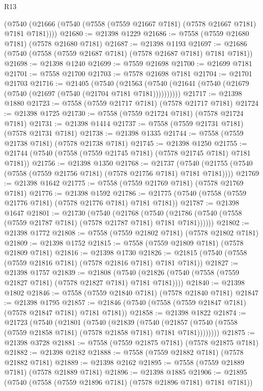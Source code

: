 \begin{lexlean}{R13}
\begin{coremodule}
    (@7540 (@21666 (@7540 (@7558 (@7559 @21667 @7181) (@7578 @21667 @7181) @7181 @7181))))
@21680 := @21398 @1229
@21686 := @7558 (@7559 @21680 @7181) (@7578 @21680 @7181)
@21687 := @21398 @1193
@21697 := @21686 (@7540 (@7558 (@7559 @21687 @7181) (@7578 @21687 @7181) @7181 @7181))
@21698 := @21398 @1240
@21699 := @7559 @21698
@21700 := @21699 @7181
@21701 := @7558 @21700
@21703 := @7578 @21698 @7181
@21704 := @21701 @21703
@21716 := @21405
    (@7540 (@21563 (@7540 (@21641 (@7540 (@21679 (@7540 (@21697 (@7540 (@21704 @7181 @7181))))))))))
@21717 := @21398 @1880
@21723 := @7558 (@7559 @21717 @7181) (@7578 @21717 @7181)
@21724 := @21398 @1725
@21730 := @7558 (@7559 @21724 @7181) (@7578 @21724 @7181)
@21731 := @21398 @1414
@21737 := @7558 (@7559 @21731 @7181) (@7578 @21731 @7181)
@21738 := @21398 @1335
@21744 := @7558 (@7559 @21738 @7181) (@7578 @21738 @7181)
@21745 := @21398 @1250
@21755 := @21744 (@7540 (@7558 (@7559 @21745 @7181) (@7578 @21745 @7181) @7181 @7181))
@21756 := @21398 @1350
@21768 := @21737
    (@7540 (@21755 (@7540 (@7558 (@7559 @21756 @7181) (@7578 @21756 @7181) @7181 @7181))))
@21769 := @21398 @1642
@21775 := @7558 (@7559 @21769 @7181) (@7578 @21769 @7181)
@21776 := @21398 @1592
@21786 := @21775 (@7540 (@7558 (@7559 @21776 @7181) (@7578 @21776 @7181) @7181 @7181))
@21787 := @21398 @1647
@21801 := @21730
    (@7540
      (@21768
        (@7540 (@21786 (@7540 (@7558 (@7559 @21787 @7181) (@7578 @21787 @7181) @7181 @7181))))))
@21802 := @21398 @1772
@21808 := @7558 (@7559 @21802 @7181) (@7578 @21802 @7181)
@21809 := @21398 @1752
@21815 := @7558 (@7559 @21809 @7181) (@7578 @21809 @7181)
@21816 := @21398 @1730
@21826 := @21815 (@7540 (@7558 (@7559 @21816 @7181) (@7578 @21816 @7181) @7181 @7181))
@21827 := @21398 @1757
@21839 := @21808
    (@7540 (@21826 (@7540 (@7558 (@7559 @21827 @7181) (@7578 @21827 @7181) @7181 @7181))))
@21840 := @21398 @1802
@21846 := @7558 (@7559 @21840 @7181) (@7578 @21840 @7181)
@21847 := @21398 @1795
@21857 := @21846 (@7540 (@7558 (@7559 @21847 @7181) (@7578 @21847 @7181) @7181 @7181))
@21858 := @21398 @1822
@21874 := @21723
    (@7540
      (@21801
        (@7540
          (@21839
            (@7540
              (@21857 (@7540 (@7558 (@7559 @21858 @7181) (@7578 @21858 @7181) @7181 @7181))))))))
@21875 := @21398 @3728
@21881 := @7558 (@7559 @21875 @7181) (@7578 @21875 @7181)
@21882 := @21398 @2182
@21888 := @7558 (@7559 @21882 @7181) (@7578 @21882 @7181)
@21889 := @21398 @2162
@21895 := @7558 (@7559 @21889 @7181) (@7578 @21889 @7181)
@21896 := @21398 @1885
@21906 := @21895 (@7540 (@7558 (@7559 @21896 @7181) (@7578 @21896 @7181) @7181 @7181))

\end{coremodule}
\end{lexlean}

